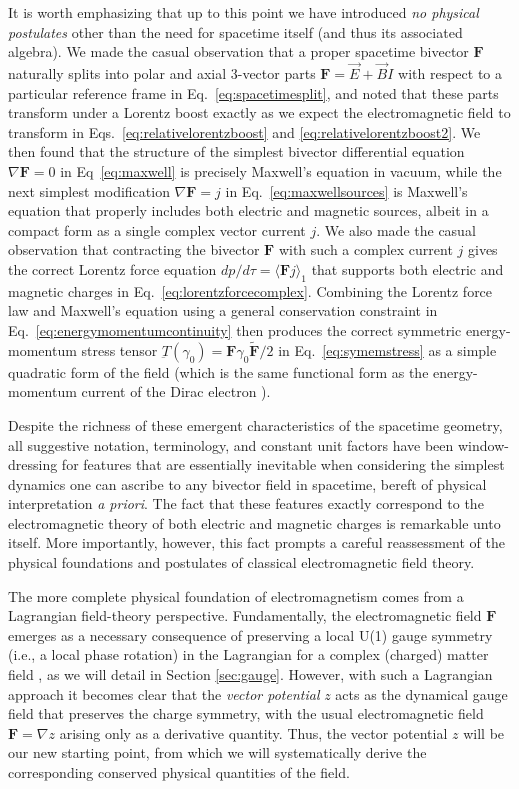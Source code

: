 \documentclass[1p,sort&compress]{elsarticle}
\numberwithin{equation}{section}
\newcommand{\rv}[1]{\vec{#1}}
\newcommand{\bv}[1]{\mathbf{#1}}
\newcommand{\mean}[1]{\langle #1 \rangle}
\begin{document}
It is worth emphasizing that up to this point we have introduced \emph{no physical postulates} other than the need for spacetime itself (and thus its associated algebra).  We made the casual observation that a proper spacetime bivector $\bv{F}$ naturally splits into polar and axial 3-vector parts $\bv{F} = \rv{E} + \rv{B}I$ with respect to a particular reference frame in Eq.~\eqref{eq:spacetimesplit}, and noted that these parts transform under a Lorentz boost exactly as we expect the electromagnetic field to transform in Eqs.~\eqref{eq:relativelorentzboost} and \eqref{eq:relativelorentzboost2}.  We then found that the structure of the simplest bivector differential equation $\nabla \bv{F} = 0$ in Eq~\eqref{eq:maxwell} is precisely Maxwell's equation in vacuum, while the next simplest modification $\nabla \bv{F} = j$ in Eq.~\eqref{eq:maxwellsources} is Maxwell's equation that properly includes both electric and magnetic sources, albeit in a compact form as a single complex vector current $j$.  We also made the casual observation that contracting the bivector $\bv{F}$ with such a complex current $j$ gives the correct Lorentz force equation $dp/d\tau = \mean{\bv{F}j}_1$ that supports both electric and magnetic charges in Eq.~\eqref{eq:lorentzforcecomplex}.  Combining the Lorentz force law and Maxwell's equation using a general conservation constraint in Eq.~\eqref{eq:energymomentumcontinuity} then produces the correct symmetric energy-momentum stress tensor $\underbar{T}(\gamma_0) = \bv{F}\gamma_0\widetilde{\bv{F}}/2$ in Eq.~\eqref{eq:symemstress} as a simple quadratic form of the field (which is the same functional form as the energy-momentum current of the Dirac electron \cite{Berestetskii1982,Doran2007,Hiley2012}).  

Despite the richness of these emergent characteristics of the spacetime geometry, all suggestive notation, terminology, and constant unit factors have been window-dressing for features that are essentially inevitable when considering the simplest dynamics one can ascribe to any bivector field in spacetime, bereft of physical interpretation \emph{a priori}.  The fact that these features exactly correspond to the electromagnetic theory of both electric and magnetic charges is remarkable unto itself.  More importantly, however, this fact prompts a careful reassessment of the physical foundations and postulates of classical electromagnetic field theory. 

The more complete physical foundation of electromagnetism comes from a Lagrangian field-theory perspective.  Fundamentally, the electromagnetic field $\bv{F}$ emerges as a necessary consequence of preserving a local U(1) gauge symmetry (i.e., a local phase rotation) in the Lagrangian for a complex (charged) matter field \cite{Weinberg1995}, as we will detail in Section \ref{sec:gauge}.  However, with such a Lagrangian approach it becomes clear that the \emph{vector potential} $z$ acts as the dynamical gauge field that preserves the charge symmetry, with the usual electromagnetic field $\bv{F} = \nabla z$ arising only as a derivative quantity.  Thus, the vector potential $z$ will be our new starting point, from which we will systematically derive the corresponding conserved physical quantities of the field.
\end{document}
